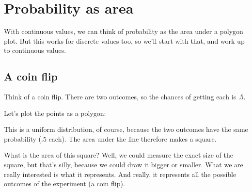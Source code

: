\documentclass[../../../main.tex]{subfiles}
\begin{document}
\chapter{Probability as area}

With continuous values, we can think of probability as the area under a polygon plot. But this works for discrete values too, so we'll start with that, and work up to continuous values.


\section{A coin flip}

Think of a coin flip. There are two outcomes, so the chances of getting each is .5. 

Let's plot the points as a polygon:

\begin{center}
\end{center}

This is a uniform distribution, of course, because the two outcomes have the same probability (.5 each). The area under the line therefore makes a square. 

What is the area of this square? Well, we could measure the exact size of the square, but that's silly, because we could draw it bigger or smaller. What we are really interested is what it represents. And really, it represents all the possible outcomes of the experiment (a coin flip). 
\end{document}
